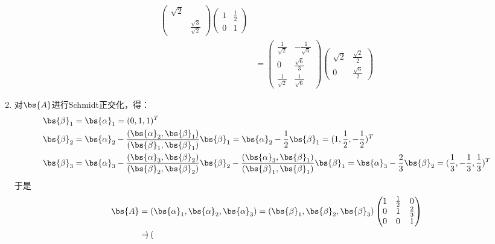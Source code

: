\documentclass[12pt, a4paper, oneside, UTF8]{ctexbook}
\begin{document}
\begin{solution}
\begin{enumerate}[label=(\arabic*)]
\begin{align*}
\begin{pmatrix}
                \sqrt{2} & \\
                & \frac{\sqrt{3}}{\sqrt{2}}
            \end{pmatrix}
                \begin{pmatrix}
                    1 &\frac{1}{2}\\
                    0 & 1
            \end{pmatrix}\\
            &=\begin{pmatrix}
                \frac{1}{\sqrt{2}}& -\frac{1}{\sqrt{6}}\\
                0& \frac{\sqrt{6}}{3}\\
                \frac{1}{\sqrt{2}}&\frac{1}{\sqrt{6}}
            \end{pmatrix}
            \begin{pmatrix}
                \sqrt{2} &\frac{\sqrt{2}}{2}\\
                0 & \frac{\sqrt{6}}{2}
            \end{pmatrix}
        \end{align*}
        \item 对$\bs{A}$进行Schmidt正交化，得：
        \begin{align*}
            \bs{\beta}_1&=\bs{\alpha}_1=(0,1,1)^T\\
            \bs{\beta}_2&=\bs{\alpha}_2-\frac{(\bs{\alpha}_2,\bs{\beta}_1)}{(\bs{\beta}_1,\bs{\beta}_1)}\bs{\beta}_1
            =\bs{\alpha}_2-\frac{1}{2}\bs{\beta}_1=
            (1,\frac{1}{2},-\frac{1}{2})^T\\
            \bs{\beta}_3&=\bs{\alpha}_3
            -\frac{(\bs{\alpha}_3,\bs{\beta}_2)}{(\bs{\beta}_2,\bs{\beta}_2)}\bs{\beta}_2
            -\frac{(\bs{\alpha}_3,\bs{\beta}_1)}{(\bs{\beta}_1,\bs{\beta}_1)}\bs{\beta}_1
            =\bs{\alpha}_3-\frac{2}{3}\bs{\beta}_2=
            (\frac{1}{3},-\frac{1}{3},\frac{1}{3})^T
        \end{align*}
        于是
        \begin{align*}
            \bs{A}
            &=(\bs{\alpha}_1,\bs{\alpha}_2,\bs{\alpha}_3)
            =(\bs{\beta}_1,\bs{\beta}_2,\bs{\beta}_3)
            \begin{pmatrix}
                1 &\frac{1}{2}&0\\
                0 & 1&\frac{2}{3} \\
                0&0&1
            \end{pmatrix}\\
            &=\begin{pmatrix}

\end{pmatrix}
\end{align*}
\end{enumerate}
\end{solution}
\end{document}
